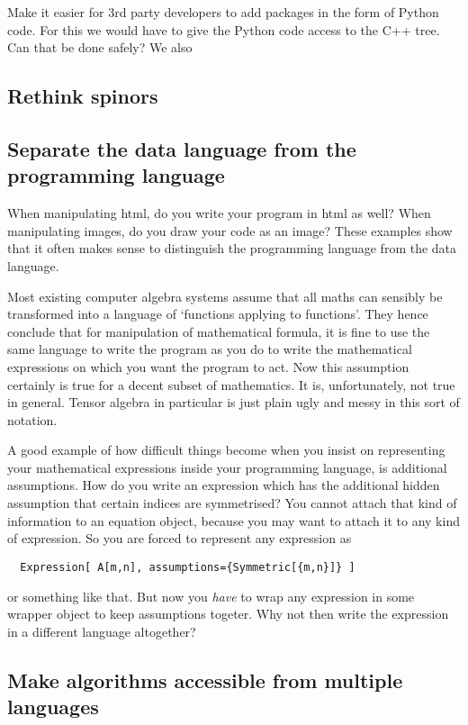\documentclass[11pt]{article}
\begin{document}
Make it easier for 3rd party developers to add packages in the form of
Python code. For this we would have to give the Python code access to
the C++ tree. Can that be done safely? We also 

\subsection{Rethink spinors}

\subsection{Separate the data language from the programming language}

When manipulating html, do you write your program in html as well?
When manipulating images, do you draw your code as an image? These
examples show that it often makes sense to distinguish the programming
language from the data language.

Most existing computer algebra systems assume that all maths can
sensibly be transformed into a language of `functions applying to
functions'. They hence conclude that for manipulation of mathematical
formula, it is fine to use the same language to write the program as
you do to write the mathematical expressions on which you want the
program to act. Now this assumption certainly is true for a decent
subset of mathematics. It is, unfortunately, not true in
general. Tensor algebra in particular is just plain ugly and messy in
this sort of notation.

A good example of how difficult things become when you insist on 
representing your mathematical expressions inside your programming language,
is additional assumptions. How do you write an expression which has the
additional hidden assumption that certain indices are symmetrised? 
You cannot attach that kind of information to an equation object, because you may 
want to attach it to any kind of expression. So you are forced to represent
any expression as
\begin{verbatim}
  Expression[ A[m,n], assumptions={Symmetric[{m,n}]} ]
\end{verbatim}
or something like that. But now you \emph{have} to wrap any expression
in some wrapper object to keep assumptions togeter. Why not then write
the expression in a different language altogether?

\subsection{Make algorithms accessible from multiple languages}
\end{document}
